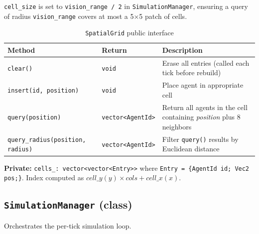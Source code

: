 \texttt{cell\_size} is set to \texttt{vision\_range / 2} in \texttt{SimulationManager},
ensuring a query of radius \texttt{vision\_range} covers at most a 5×5 patch of cells.

\begin{table}[H]
\centering\small
\caption{\texttt{SpatialGrid} public interface}
\begin{tabularx}{\textwidth}{@{}llX@{}}
\toprule
\textbf{Method} & \textbf{Return} & \textbf{Description} \\
\midrule
\texttt{clear()} & \texttt{void} & Erase all entries (called each tick before rebuild) \\
\texttt{insert(id, position)} & \texttt{void} & Place agent in appropriate cell \\
\texttt{query(position)} & \texttt{vector<AgentId>} & Return all agents in the cell containing \emph{position} plus 8 neighbors \\
\texttt{query\_radius(position, radius)} & \texttt{vector<AgentId>} & Filter \texttt{query()} results by Euclidean distance \\
\bottomrule
\end{tabularx}
\end{table}

\textbf{Private:} \texttt{cells\_: vector<vector<Entry>>} where
\texttt{Entry = \{AgentId id; Vec2 pos;\}}.
Index computed as $\mathit{cell\_y}(y) \times \mathit{cols} + \mathit{cell\_x}(x)$.

\subsection{\texttt{SimulationManager} (class)}

Orchestrates the per-tick simulation loop.

